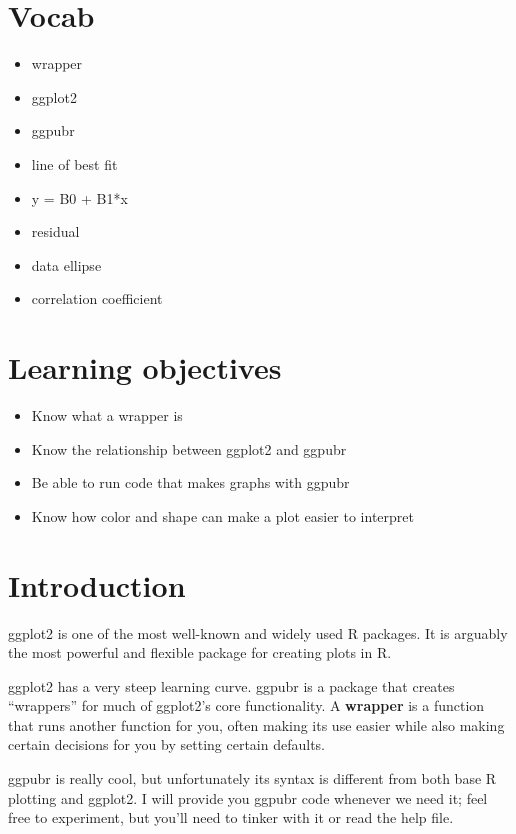 \documentclass[
]{book}
\providecommand{\tightlist}{%
  \setlength{\itemsep}{0pt}\setlength{\parskip}{0pt}}
\begin{document}
\hypertarget{vocab}{%
\section{Vocab}\label{vocab}}

\begin{itemize}
\tightlist
\item
  wrapper
\item
  ggplot2
\item
  ggpubr
\item
  line of best fit
\item
  y = B0 + B1*x
\item
  residual
\item
  data ellipse
\item
  correlation coefficient
\end{itemize}

\hypertarget{learning-objectives-1}{%
\section{Learning objectives}\label{learning-objectives-1}}

\begin{itemize}
\tightlist
\item
  Know what a wrapper is
\item
  Know the relationship between ggplot2 and ggpubr
\item
  Be able to run code that makes graphs with ggpubr
\item
  Know how color and shape can make a plot easier to interpret
\end{itemize}

\hypertarget{introduction-3}{%
\section{Introduction}\label{introduction-3}}

ggplot2 is one of the most well-known and widely used R packages. It is arguably the most powerful and flexible package for creating plots in R.

ggplot2 has a very steep learning curve. ggpubr is a package that creates ``wrappers'' for much of ggplot2's core functionality. A \textbf{wrapper} is a function that runs another function for you, often making its use easier while also making certain decisions for you by setting certain defaults.

ggpubr is really cool, but unfortunately its syntax is different from both base R plotting and ggplot2. I will provide you ggpubr code whenever we need it; feel free to experiment, but you'll need to tinker with it or read the help file.
\end{document}
